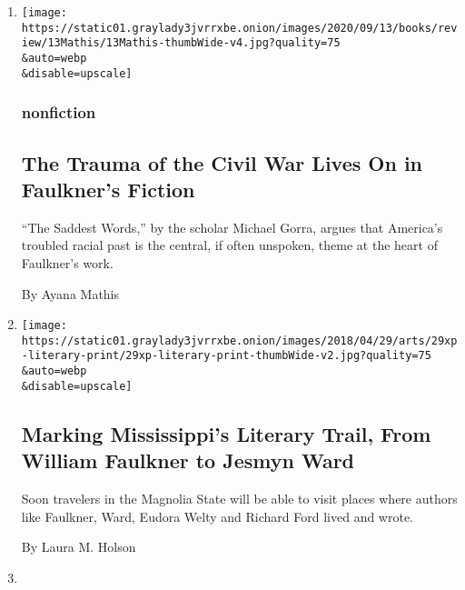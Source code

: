 \begin{enumerate}
\def\labelenumi{\arabic{enumi}.}
\item
  \href{/2020/08/25/books/review/the-saddest-words-michael-gorra.html}{}

  \texttt{[image: https://static01.graylady3jvrrxbe.onion/images/2020/09/13/books/review/13Mathis/13Mathis-thumbWide-v4.jpg?quality=75\\\&auto=webp\\\&disable=upscale]}

  \hypertarget{nonfiction}{%
  \subsubsection{nonfiction}\label{nonfiction}}

  \hypertarget{the-trauma-of-the-civil-war-lives-on-in-faulkners-fiction}{%
  \subsection{The Trauma of the Civil War Lives On in Faulkner's
  Fiction}\label{the-trauma-of-the-civil-war-lives-on-in-faulkners-fiction}}

  ``The Saddest Words,'' by the scholar Michael Gorra, argues that
  America's troubled racial past is the central, if often unspoken,
  theme at the heart of Faulkner's work.

  By Ayana Mathis
\item
  \href{/2018/04/27/books/books-mississippi-faulkner-trail.html}{}

  \texttt{[image: https://static01.graylady3jvrrxbe.onion/images/2018/04/29/arts/29xp-literary-print/29xp-literary-print-thumbWide-v2.jpg?quality=75\\\&auto=webp\\\&disable=upscale]}

  \hypertarget{marking-mississippis-literary-trail-from-william-faulkner-to-jesmyn-ward}{%
  \subsection{Marking Mississippi's Literary Trail, From William
  Faulkner to Jesmyn
  Ward}\label{marking-mississippis-literary-trail-from-william-faulkner-to-jesmyn-ward}}

  Soon travelers in the Magnolia State will be able to visit places
  where authors like Faulkner, Ward, Eudora Welty and Richard Ford lived
  and wrote.

  By Laura M. Holson
\item
  \href{https://lens.blogs.nytimes3xbfgragh.onion/2017/11/02/a-storytelling-revival-in-mississippi/}{}


\end{enumerate}
